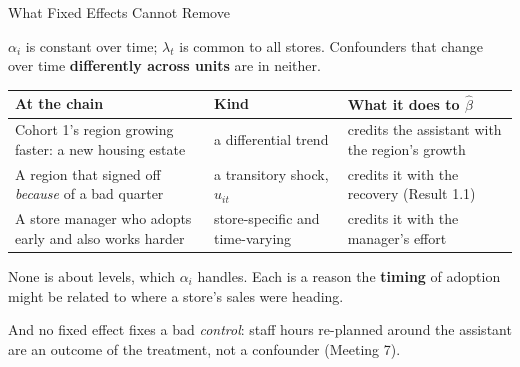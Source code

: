 \documentclass[aspectratio=169, 11pt, handout]{beamer}
\begin{document}
\begin{frame}{What Fixed Effects Cannot Remove}

$\alpha_i$ is constant over time; $\lambda_t$ is common to all stores. Confounders that change over time \textbf{differently across units} are in neither.

\begin{center}
\small
\begin{tabular}{L{5.3cm}L{3.0cm}L{4.3cm}}
\toprule
\textbf{At the chain} & \textbf{Kind} & \textbf{What it does to $\hat\beta$} \\
\midrule
Cohort 1's region growing faster: a new housing estate & a differential trend & credits the assistant with the region's growth \\[0.4em]
A region that signed off \emph{because} of a bad quarter & a transitory shock, $u_{it}$ & credits it with the recovery (Result 1.1) \\[0.4em]
A store manager who adopts early and also works harder & store-specific and time-varying & credits it with the manager's effort \\
\bottomrule
\end{tabular}
\end{center}

\medskip

None is about levels, which $\alpha_i$ handles. Each is a reason the \textbf{timing} of adoption might be related to where a store's sales were heading.

\medskip

And no fixed effect fixes a bad \emph{control}: staff hours re-planned around the assistant are an outcome of the treatment, not a confounder (Meeting 7).
\end{frame}
\end{document}
